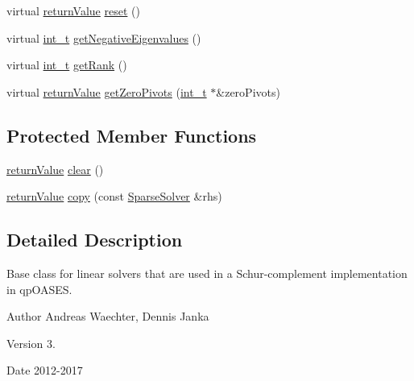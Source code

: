 \begin{DoxyCompactItemize}
\item 
virtual \hyperlink{_message_handling_8hpp_a81d556f613bfbabd0b1f9488c0fa865e}{return\+Value} \hyperlink{class_sparse_solver_a917d966b021d7d116780d3cec3a196d8}{reset} ()
\item 
virtual \hyperlink{_types_8hpp_ab6fd6105e64ed14a0c9281326f05e623}{int\+\_\+t} \hyperlink{class_sparse_solver_aec58a68072134a812784d6dc92282f4d}{get\+Negative\+Eigenvalues} ()
\item 
virtual \hyperlink{_types_8hpp_ab6fd6105e64ed14a0c9281326f05e623}{int\+\_\+t} \hyperlink{class_sparse_solver_a99e865b040662425f112e48cb74aa9ce}{get\+Rank} ()
\item 
virtual \hyperlink{_message_handling_8hpp_a81d556f613bfbabd0b1f9488c0fa865e}{return\+Value} \hyperlink{class_sparse_solver_a0c5a2e2132ccec5732252f1786998406}{get\+Zero\+Pivots} (\hyperlink{_types_8hpp_ab6fd6105e64ed14a0c9281326f05e623}{int\+\_\+t} $\ast$\&zero\+Pivots)
\end{DoxyCompactItemize}
\subsection*{Protected Member Functions}
\begin{DoxyCompactItemize}
\item 
\hyperlink{_message_handling_8hpp_a81d556f613bfbabd0b1f9488c0fa865e}{return\+Value} \hyperlink{class_sparse_solver_a3471628e99d49f5c2ec94573f00d7f9c}{clear} ()
\item 
\hyperlink{_message_handling_8hpp_a81d556f613bfbabd0b1f9488c0fa865e}{return\+Value} \hyperlink{class_sparse_solver_a0d39524a52ac941663c6789d00282494}{copy} (const \hyperlink{class_sparse_solver}{Sparse\+Solver} \&rhs)
\end{DoxyCompactItemize}


\subsection{Detailed Description}
Base class for linear solvers that are used in a Schur-\/complement implementation in qp\+O\+A\+S\+ES. 

\begin{DoxyAuthor}{Author}
Andreas Waechter, Dennis Janka 
\end{DoxyAuthor}
\begin{DoxyVersion}{Version}
3. 
\end{DoxyVersion}
\begin{DoxyDate}{Date}
2012-\/2017 
\end{DoxyDate}


